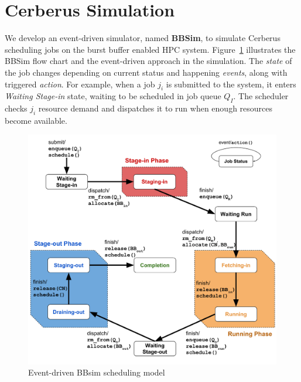 

\section{Cerberus Simulation}
\label{Sec:Simulation}

We develop an event-driven simulator, named \textbf{BBSim},
to simulate Cerberus scheduling jobs on the burst buffer enabled HPC system.
Figure~\ref{Fig:JobFSM} illustrates the BBSim flow chart and the event-driven approach in the simulation.
The \textit{state} of the job changes depending on current status and
happening \textit{events}, along with triggered \textit{action}.
For example, when a job $j_i$ is submitted to the system, 
it enters \textit{Waiting Stage-in} state, 
waiting to be scheduled in job queue $Q_I$. 
The scheduler checks $j_i$ resource demand and 
dispatches it to run when enough resources become available.

\begin{figure}[!htbp]
\centering
        \includegraphics[width=3.3 in]{3PhaseJobFSM}
        \caption{Event-driven BBsim scheduling model}
\label{Fig:JobFSM}
\end{figure}

